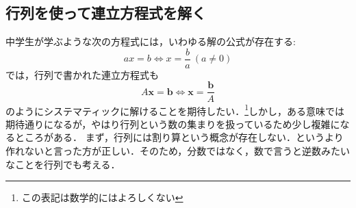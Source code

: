 \documentclass[a4paper,12pt,autodetect-engine,dvipdfmx]{jsarticle}
\theoremstyle{definition}
\begin{document}
\subsection{行列を使って連立方程式を解く}
中学生が学ぶような次の方程式には，いわゆる解の公式が存在する:
\begin{equation*}
    ax = b \Leftrightarrow x = \dfrac{b}{a} \ (a \neq 0)
\end{equation*}
では，行列で書かれた連立方程式も
\begin{equation*}
    A\bm{x} = \bm{b} \Leftrightarrow \bm{x} = \dfrac{\bm{b}}{A}
\end{equation*}
のようにシステマティックに解けることを期待したい．\footnote{この表記は数学的にはよろしくない}しかし，ある意味では期待通りになるが，やはり行列という数の集まりを扱っているため少し複雑になるところがある．
まず，行列には割り算という概念が存在しない．というより作れないと言った方が正しい．そのため，分数ではなく，数で言うと逆数みたいなことを行列でも考える．
\end{document}

